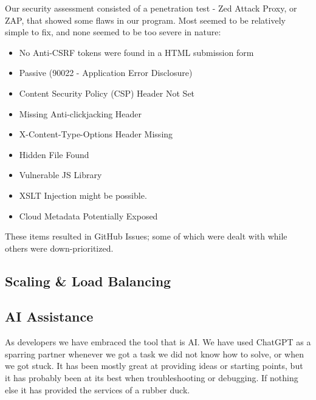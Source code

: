 Our security assessment consisted of a penetration test - Zed Attack Proxy, or ZAP, that showed some flaws in our program. Most seemed to be relatively simple to fix, and none seemed to be too severe in nature:
\begin{itemize}
    \item No Anti-CSRF tokens were found in a HTML submission form
    \item Passive (90022 - Application Error Disclosure)
    \item Content Security Policy (CSP) Header Not Set
    \item Missing Anti-clickjacking Header
    \item X-Content-Type-Options Header Missing
    \item Hidden File Found
    \item Vulnerable JS Library
    \item XSLT Injection might be possible.
    \item Cloud Metadata Potentially Exposed
\end{itemize}

\noindent These items resulted in GitHub Issues; some of which were dealt with while others were down-prioritized.

\subsection{Scaling \& Load Balancing}





\subsection{AI Assistance}



\noindent As developers we have embraced the tool that is AI. We have used ChatGPT as a sparring partner whenever we got a task we did not know how to solve, or when we got stuck. It has been mostly great at providing ideas or starting points, but it has probably been at its best when troubleshooting or debugging. If nothing else it has provided the services of a rubber duck.

